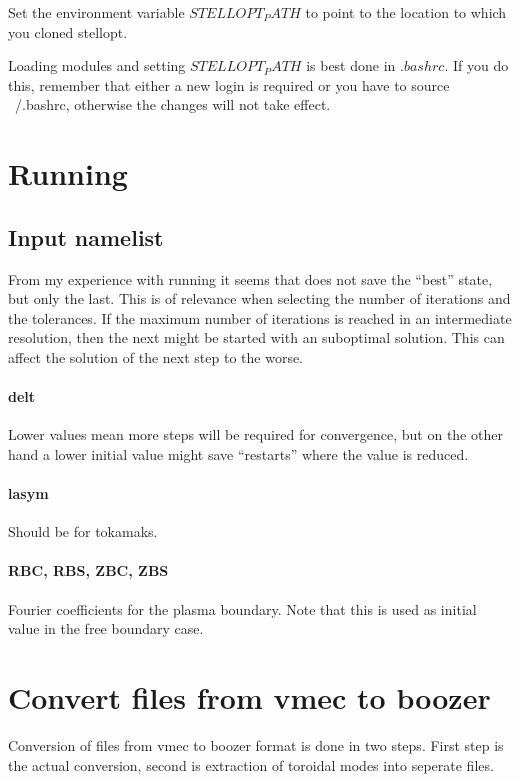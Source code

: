 \documentclass{article}
\begin{document}
Set the environment variable $STELLOPT_PATH$ to point to the location to
which you cloned stellopt.

Loading modules and setting $STELLOPT_PATH$ is best done in $.bashrc$.
If you do this, remember that either a new login is required or you have
to source ~/.bashrc, otherwise the changes will not take effect.


\section{Running}

\subsection{Input namelist}
From my experience with running  it seems that  does
not save the ``best'' state, but only the last.
This is of relevance when selecting the number of iterations and the
tolerances. If the maximum number of iterations is reached in an
intermediate resolution, then the next might be started with an
suboptimal solution. This can affect the solution of the next step to
the worse.

\paragraph{delt}
Lower values mean more steps will be required for convergence, but on
the other hand a lower initial value might save ``restarts'' where the
value is reduced.

\paragraph{lasym}
Should be  for tokamaks.

\paragraph{RBC, RBS, ZBC, ZBS}
Fourier coefficients for the plasma boundary. Note that this is used as
initial value in the free boundary case.


\section{Convert files from vmec to boozer}
Conversion of files from vmec to boozer format is done in two steps.
First step is the actual conversion, second is extraction of toroidal
modes into seperate files.
\end{document}
